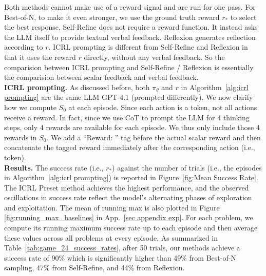 \documentclass{article} %
\newcommand{\0}{\mathbf{0}}
\begin{document}
Both methods cannot make use of a reward signal and are run for one pass.
For Best-of-N, to make it even stronger,
we use the ground truth reward $r_*$ to select the best response.
Self-Refine does not require a reward function.
It instead asks the LLM itself to provide textual verbal feedback.
Reflexion generates reflection according to $r$.
ICRL prompting is different from Self-Refine and Reflexion in that it uses the reward $r$ directly,
without any verbal feedback.
So the comparision between ICRL prompting and Self-Refine / Reflexion is essentially the comparision between scalar feedback and verbal feedback. \\

\textbf{ICRL prompting.} 
As discussed before, both $\pi_\theta$ and $r$ in Algorithm~\ref{alg:icrl prompting} are the same LLM GPT-4.1 (prompted differently). 
We now clarify how we compute $S_0$ at each episode.
Since each action is a token,
not all actions receive a reward.
In fact,
since we use CoT to prompt the LLM for 4 thinking steps,
only 4 rewards are available for each episode.
We thus only include those 4 rewards in $S_0$.
We add a ``Reward: '' tag before the actual scalar reward and then concatenate the tagged reward immediately after the corresponding action (i.e., token). \\

\textbf{Results.} 
The success rate (i.e., $r_*$) against the number of trials (i.e., the episodes in Algorithm~\ref{alg:icrl prompting}) is reported in Figure~\ref{fig:Mean Success Rate}. The ICRL Preset method achieves the highest performance, and the observed oscillations in success rate reflect the model's alternating phases of exploration and exploitation. The mean of running max is also plotted in Figure \ref{fig:running_max_baselines} in App.~\ref{sec appendix exp}. For each problem, we compute its running maximum success rate up to each episode and then average these values across all problems at every episode. 
As summarized in Table~\ref{tab:game_24_success_rates},
after 50 trials,
our methods
achieve a success rate of 90\% which is significantly higher than 49\% from Best-of-N sampling, 47\% from Self-Refine, and 44\% from Reflexion. 
\end{document}
